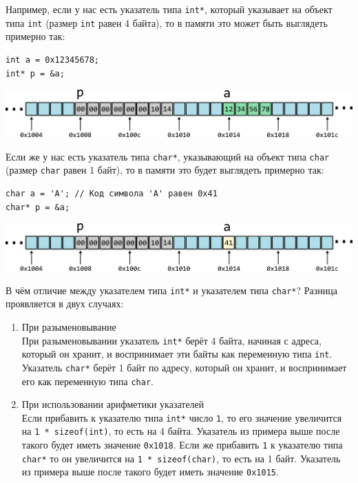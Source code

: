 \documentclass[10pt]{article}
\begin{document}
Например, если у нас есть указатель типа \texttt{int*}, который указывает на объект типа \texttt{int} (размер \texttt{int} равен 4 байта), то в памяти это может быть выглядеть примерно так:
\begin{lstlisting}
int a = 0x12345678;
int* p = &a;
\end{lstlisting}

\begin{center}
\includegraphics[scale=1]{../images/memory_3_pointer_to_int_b.png}
\end{center}

Если же у нас есть указатель типа \texttt{char*}, указывающий на объект типа \texttt{char} (размер \texttt{char} равен 1 байт), то в памяти это будет выглядеть примерно так:
\begin{lstlisting}
char a = 'A'; // Код символа 'A' равен 0x41 
char* p = &a;
\end{lstlisting}

\begin{center}
\includegraphics[scale=1]{../images/memory_3_pointer_to_char_b.png}
\end{center}

\newpage
В чём отличие между указателем типа \texttt{int*} и указателем типа \texttt{char*}? Разница проявляется в двух случаях:
\begin{enumerate}
\item При разыменовывание\\
При разыменовывании указатель \texttt{int*} берёт 4 байта, начиная с адреса, который он хранит, и воспринимает эти байты как переменную типа \texttt{int}. Указатель \texttt{char*} берёт 1 байт по адресу, который он хранит, и воспринимает его как переменную типа \texttt{char}.

\item При использовании арифметики указателей\\
Если прибавить к указателю типа \texttt{int*} число \texttt{1}, то его значение увеличится на \texttt{1 * sizeof(int)}, то есть на 4 байта. Указатель из примера выше после такого будет иметь значение \texttt{0x1018}. Если же прибавить \texttt{1} к указателю типа \texttt{char*} то он увеличится на \texttt{1 * sizeof(char)}, то есть на 1 байт. Указатель из примера выше после такого будет иметь значение \texttt{0x1015}.
\end{enumerate}
\end{document}
